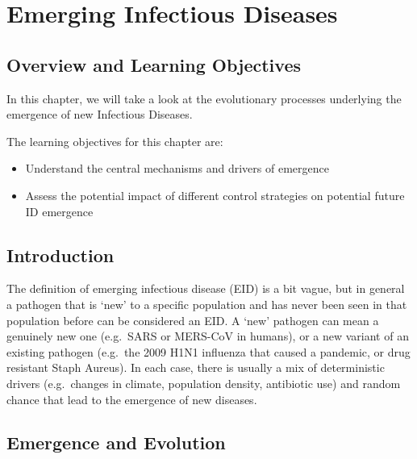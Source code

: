 \documentclass[]{book}
\providecommand{\tightlist}{%
  \setlength{\itemsep}{0pt}\setlength{\parskip}{0pt}}
\theoremstyle{definition}
\theoremstyle{definition}
\theoremstyle{definition}
\theoremstyle{remark}
\begin{document}
\chapter{Emerging Infectious
Diseases}\label{emerging-infectious-diseases}

\section{Overview and Learning
Objectives}\label{overview-and-learning-objectives-14}

In this chapter, we will take a look at the evolutionary processes
underlying the emergence of new Infectious Diseases.

The learning objectives for this chapter are:

\begin{itemize}
\tightlist
\item
  Understand the central mechanisms and drivers of emergence
\item
  Assess the potential impact of different control strategies on
  potential future ID emergence
\end{itemize}

\section{Introduction}\label{introduction-14}

The definition of emerging infectious disease (EID) is a bit vague, but
in general a pathogen that is `new' to a specific population and has
never been seen in that population before can be considered an EID. A
`new' pathogen can mean a genuinely new one (e.g.~SARS or MERS-CoV in
humans), or a new variant of an existing pathogen (e.g.~the 2009 H1N1
influenza that caused a pandemic, or drug resistant Staph Aureus). In
each case, there is usually a mix of deterministic drivers (e.g.~changes
in climate, population density, antibiotic use) and random chance that
lead to the emergence of new diseases.

\section{Emergence and Evolution}\label{emergence-and-evolution}
\end{document}
